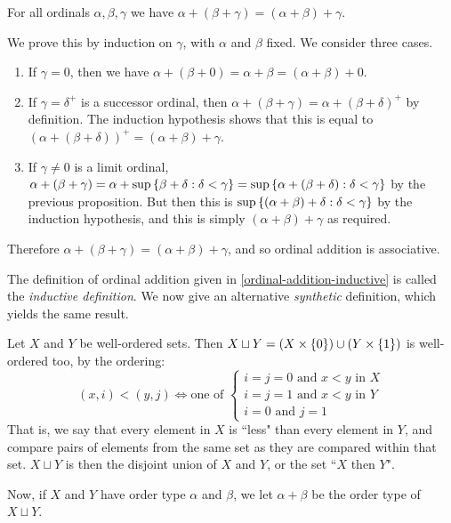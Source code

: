 \documentclass{article}
\begin{document}
\begin{proposition}
	\label{ordinal-addition-associative}
    For all ordinals $\alpha, \beta, \gamma$ we have $\alpha + (\beta + \gamma) = (\alpha + \beta) + \gamma$.
\end{proposition}

\begin{prf}
    We prove this by induction on $\gamma$, with $\alpha$ and $\beta$ fixed. We consider three cases.
    \begin{enumerate}
    	\item If $\gamma = 0$, then we have $\alpha + (\beta + 0) = \alpha + \beta = (\alpha + \beta) + 0$.
    	\item If $\gamma = \delta^+$ is a successor ordinal, then $\alpha + (\beta + \gamma) = \alpha + (\beta + \delta)^+$ by definition. The induction hypothesis shows that this is equal to $(\alpha + (\beta + \delta))^+ = (\alpha + \beta) + \gamma$.
    	\item If $\gamma \neq 0$ is a limit ordinal, $\alpha + (\beta + \gamma) = \alpha + \sup \left\lbrace \beta + \delta : \delta < \gamma \right\rbrace = \sup \left\lbrace \alpha + (\beta + \delta) : \delta < \gamma \right\rbrace$ by the previous proposition. But then this is $\sup \left\lbrace (\alpha + \beta) + \delta : \delta < \gamma \right\rbrace$ by the induction hypothesis, and this is simply $(\alpha + \beta) + \gamma$ as required.
	\end{enumerate}
	Therefore $\alpha + (\beta + \gamma) = (\alpha + \beta) + \gamma$, and so ordinal addition is associative.
\end{prf}

\begin{note}
	The definition of ordinal addition given in \ref{ordinal-addition-inductive} is called the \textit{inductive definition}. We now give an alternative \textit{synthetic} definition, which yields the same result.
\end{note}

\begin{definition}
	\label{ordinal-addition-synthetic}
    Let $X$ and $Y$ be well-ordered sets. Then $X \sqcup Y = (X \times \left\lbrace 0 \right\rbrace) \cup (Y \times \left\lbrace 1 \right\rbrace)$ is well-ordered too, by the ordering:
    \[
	(x, i) < (y, j) \iff \text{one of } \begin{cases}
		i = j = 0 \text{ and } x < y \text{ in } X \\
		i = j = 1 \text{ and } x < y \text{ in } Y \\
		i = 0 \text{ and } j = 1
	\end{cases}
	\]
	That is, we say that every element in $X$ is ``less" than every element in $Y$, and compare pairs of elements from the same set as they are compared within that set. $X \sqcup Y$ is then the disjoint union of $X$ and $Y$, or the set ``$X$ then $Y$".
	
	Now, if $X$ and $Y$ have order type $\alpha$ and $\beta$, we let $\alpha + \beta$ be the order type of $X \sqcup Y$.
\end{definition}
\end{document}
